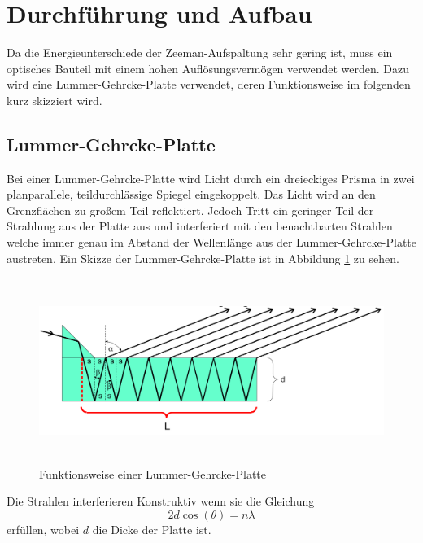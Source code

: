 \section{Durchführung und Aufbau}
\label{sec:Durchführung}

Da die Energieunterschiede der Zeeman-Aufspaltung sehr gering ist, muss ein optisches Bauteil mit einem hohen Auflösungsvermögen verwendet werden. Dazu wird eine Lummer-Gehrcke-Platte verwendet, deren Funktionsweise im folgenden kurz skizziert wird. 
\subsection{Lummer-Gehrcke-Platte}
Bei einer Lummer-Gehrcke-Platte wird Licht durch ein dreieckiges Prisma in zwei planparallele, teildurchlässige Spiegel eingekoppelt. Das Licht wird an den Grenzflächen zu großem Teil reflektiert. Jedoch Tritt ein geringer Teil der Strahlung aus der Platte aus und interferiert mit den benachtbarten Strahlen welche immer genau im Abstand der Wellenlänge aus der Lummer-Gehrcke-Platte austreten. Ein Skizze der Lummer-Gehrcke-Platte ist in Abbildung \ref{fig:Lum} zu sehen.

\begin{figure}[H]
  \centering
  \includegraphics[height=6cm]{Bilder/Lummer.png}
  \caption{Funktionsweise einer Lummer-Gehrcke-Platte \cite{V27}}
  \label{fig:Lum}
\end{figure}

Die Strahlen interferieren Konstruktiv wenn sie die Gleichung 
\begin{equation}
  2 d \cos(\theta) = n \lambda
  \label{}
\end{equation}
erfüllen, wobei $d$ die Dicke der Platte ist.

